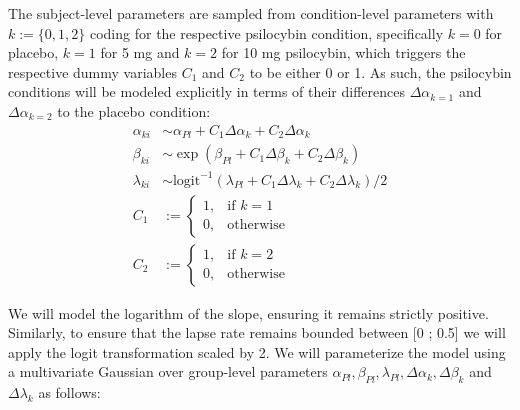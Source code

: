 \documentclass{article}
\begin{document}
The subject-level parameters are sampled from condition-level parameters with $k := \{0, 1, 2\}$ coding for the respective psilocybin condition, specifically $k=0$ for placebo, $k=1$ for 5 mg and $k=2$ for 10 mg psilocybin, which triggers the respective dummy variables $C_1$ and $C_2$ to be either 0 or 1. As such, the psilocybin conditions will be modeled explicitly in terms of their differences $\Delta\alpha_{k=1}$ and $\Delta\alpha_{k=2}$ to the placebo condition:
\begin{align*}
\alpha_{ki} &\sim  \alpha_{Pl} + C_1 \Delta\alpha_{k} + C_2 \Delta\alpha_{k} \\
\beta_{ki} &\sim \exp(\beta_{Pl} + C_1 \Delta\beta_{k} + C_2 \Delta\beta_{k}) \\
\lambda_{ki} &\sim \text{logit}^{-1}(\lambda_{Pl} + C_1 \Delta\lambda_{k} + C_2 \Delta\lambda_{k})/2\\ 
C_1 &:= \begin{cases}
    1,& \text{if } k = 1\\
    0,& \text{otherwise}
\end{cases} \\
C_2 &:= \begin{cases}
    1,& \text{if } k = 2\\
    0,& \text{otherwise}
\end{cases}
\end{align*}


We will model the logarithm of the slope, ensuring it remains strictly positive. Similarly, to ensure that the lapse rate remains bounded between [0 ; 0.5] we will apply the logit transformation scaled by 2.
We will parameterize the model using a multivariate Gaussian over group-level parameters $\alpha_{Pl}, \beta_{Pl}, \lambda_{Pl}, \Delta\alpha_{k}, \Delta\beta_{k}$ and $\Delta\lambda_{k}$ as follows:
\end{document}
